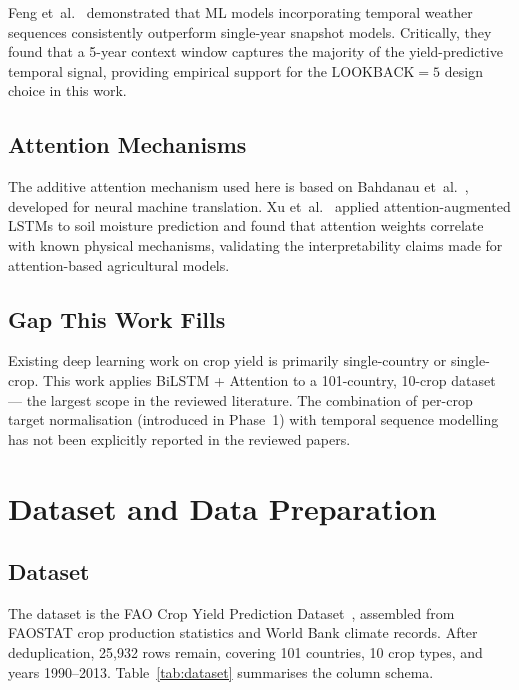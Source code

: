 \documentclass[conference]{IEEEtran}
\begin{document}
Feng et~al.~\cite{feng2019} demonstrated that ML models incorporating temporal
weather sequences consistently outperform single-year snapshot models.
Critically, they found that a 5-year context window captures the majority of the
yield-predictive temporal signal, providing empirical support for the
$\text{LOOKBACK}=5$ design choice in this work.

\subsection{Attention Mechanisms}
The additive attention mechanism used here is based on Bahdanau
et~al.~\cite{bahdanau2015}, developed for neural machine translation.
Xu et~al.~\cite{xu2019} applied attention-augmented LSTMs to soil moisture
prediction and found that attention weights correlate with known physical mechanisms,
validating the interpretability claims made for attention-based agricultural models.

\subsection{Gap This Work Fills}
Existing deep learning work on crop yield is primarily single-country or single-crop.
This work applies BiLSTM + Attention to a 101-country, 10-crop dataset — the largest
scope in the reviewed literature.
The combination of per-crop target normalisation (introduced in Phase~1) with
temporal sequence modelling has not been explicitly reported in the reviewed papers.

\section{Dataset and Data Preparation}
\label{sec:data}

\subsection{Dataset}
The dataset is the FAO Crop Yield Prediction Dataset~\cite{fao2023}, assembled from
FAOSTAT crop production statistics and World Bank climate records.
After deduplication, 25,932 rows remain, covering 101 countries, 10 crop types,
and years 1990--2013.
Table~\ref{tab:dataset} summarises the column schema.
\end{document}
